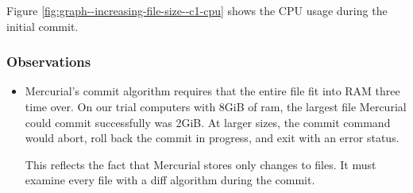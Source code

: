 \documentclass[a4paper]{article}
\begin{document}
Figure \ref{fig:graph--increasing-file-size--c1-cpu} shows the
CPU usage during the initial commit.

\iffalse

\subsubsection{Observations}

\begin{itemize}

  \item Mercurial's commit algorithm requires that the entire file fit into RAM
    three time over. On our trial computers with 8GiB of ram, the largest file
    Mercurial could commit successfully was 2GiB. At larger sizes, the commit
    command would abort, roll back the commit in progress, and exit with an
    error status.

    This reflects the fact that Mercurial stores only changes to files. It must
    examine every file with a diff algorithm during the commit.

\end{itemize}

\end{document}
